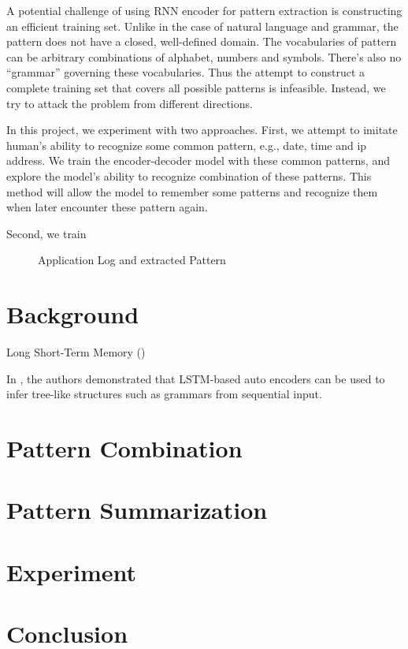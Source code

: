 \documentclass{article}
\begin{document}
A potential challenge of using RNN encoder for pattern extraction is constructing an efficient training set. Unlike in the case of natural language and grammar, the pattern does not have a closed, well-defined domain. The vocabularies of pattern can be arbitrary combinations of alphabet, numbers and symbols. There's also no ``grammar'' governing these vocabularies. Thus the attempt to construct a complete training set that covers all possible patterns is infeasible. Instead, we try to attack the problem from different directions.

In this project, we experiment with two approaches. First, we attempt to imitate human's ability to recognize some common pattern, e.g., date, time and ip address. We train the encoder-decoder model with these common patterns, and explore the model's ability to recognize combination of these patterns. This method will allow the model to remember some patterns and recognize them when later encounter these pattern again.

Second, we train
\begin{figure}
\centering
{}
\caption{Application Log and extracted Pattern}
\label{fig:pattern}
\end{figure}

\section{Background}
Long Short-Term Memory (\cite{lstm_1997})
 
In \cite{grammar_2014}, the authors demonstrated that LSTM-based auto encoders can be used to infer tree-like structures such as grammars from sequential input.

\section{Pattern Combination}

\section{Pattern Summarization}

\section{Experiment}

\section{Conclusion}



\end{document}
